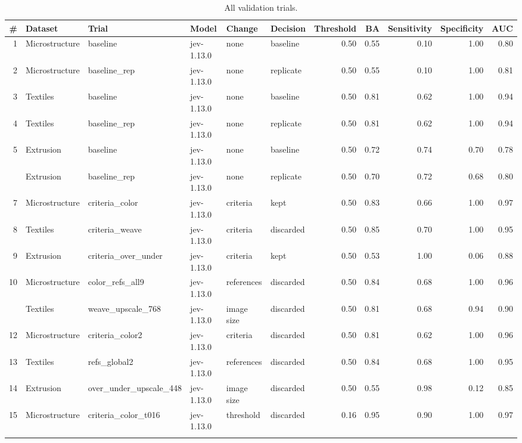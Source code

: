 \begin{table}

\caption{\label{tab:tbl-trials}All validation trials.}
\centering
\begin{tabular}[t]{rlllllrrrrr}
\toprule
\# & Dataset & Trial & Model & Change & Decision & Threshold & BA & Sensitivity & Specificity & AUC\\
\midrule
1 & Microstructure & baseline & jev-1.13.0 & none & baseline & 0.50 & 0.55 & 0.10 & 1.00 & 0.80\\
2 & Microstructure & baseline\_rep & jev-1.13.0 & none & replicate & 0.50 & 0.55 & 0.10 & 1.00 & 0.81\\
3 & Textiles & baseline & jev-1.13.0 & none & baseline & 0.50 & 0.81 & 0.62 & 1.00 & 0.94\\
4 & Textiles & baseline\_rep & jev-1.13.0 & none & replicate & 0.50 & 0.81 & 0.62 & 1.00 & 0.94\\
5 & Extrusion & baseline & jev-1.13.0 & none & baseline & 0.50 & 0.72 & 0.74 & 0.70 & 0.78\\
\addlinespace
6 & Extrusion & baseline\_rep & jev-1.13.0 & none & replicate & 0.50 & 0.70 & 0.72 & 0.68 & 0.80\\
7 & Microstructure & criteria\_color & jev-1.13.0 & criteria & kept & 0.50 & 0.83 & 0.66 & 1.00 & 0.97\\
8 & Textiles & criteria\_weave & jev-1.13.0 & criteria & discarded & 0.50 & 0.85 & 0.70 & 1.00 & 0.95\\
9 & Extrusion & criteria\_over\_under & jev-1.13.0 & criteria & kept & 0.50 & 0.53 & 1.00 & 0.06 & 0.88\\
10 & Microstructure & color\_refs\_all9 & jev-1.13.0 & references & discarded & 0.50 & 0.84 & 0.68 & 1.00 & 0.96\\
\addlinespace
11 & Textiles & weave\_upscale\_768 & jev-1.13.0 & image size & discarded & 0.50 & 0.81 & 0.68 & 0.94 & 0.90\\
12 & Microstructure & criteria\_color2 & jev-1.13.0 & criteria & discarded & 0.50 & 0.81 & 0.62 & 1.00 & 0.96\\
13 & Textiles & refs\_global2 & jev-1.13.0 & references & discarded & 0.50 & 0.84 & 0.68 & 1.00 & 0.95\\
14 & Extrusion & over\_under\_upscale\_448 & jev-1.13.0 & image size & discarded & 0.50 & 0.55 & 0.98 & 0.12 & 0.85\\
15 & Microstructure & criteria\_color\_t016 & jev-1.13.0 & threshold & discarded & 0.16 & 0.95 & 0.90 & 1.00 & 0.97\\
\addlinespace

\end{tabular}
\end{table}
